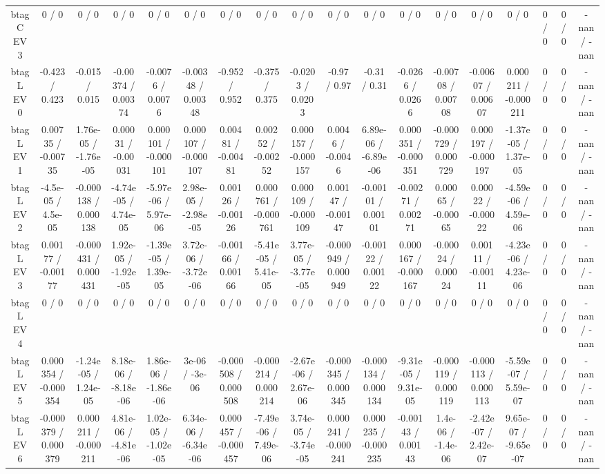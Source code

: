\documentclass[10pt]{article}
\begin{document}
\begin{table}[htbp]
\begin{center}
\begin{tabular}{|c|c|c|c|c|c|c|c|c|c|c|c|c|c|c|c|c|c|}
  btag C EV 3 & 0 / 0 & 0 / 0 & 0 / 0 & 0 / 0 & 0 / 0 & 0 / 0 & 0 / 0 & 0 / 0 & 0 / 0 & 0 / 0 & 0 / 0 & 0 / 0 & 0 / 0 & 0 / 0 & 0 / 0 & 0 / 0 & -nan / -nan \\ 
  btag L EV 0 & -0.423 / 0.423 & -0.015 / 0.015 & -0.00374 / 0.00374 & -0.0076 / 0.0076 & -0.00348 / 0.00348 & -0.952 / 0.952 & -0.375 / 0.375 & -0.0203 / 0.0203 & -0.97 / 0.97 & -0.31 / 0.31 & -0.0266 / 0.0266 & -0.00708 / 0.00708 & -0.00607 / 0.00607 & 0.000211 / -0.000211 & 0 / 0 & 0 / 0 & -nan / -nan \\ 
  btag L EV 1 & 0.00735 / -0.00735 & 1.76e-05 / -1.76e-05 & 0.00031 / -0.00031 & 0.000101 / -0.000101 & 0.000107 / -0.000107 & 0.00481 / -0.00481 & 0.00252 / -0.00252 & 0.000157 / -0.000157 & 0.0046 / -0.0046 & 6.89e-06 / -6.89e-06 & 0.000351 / -0.000351 & -0.000729 / 0.000729 & 0.000197 / -0.000197 & -1.37e-05 / 1.37e-05 & 0 / 0 & 0 / 0 & -nan / -nan \\ 
  btag L EV 2 & -4.5e-05 / 4.5e-05 & -0.000138 / 0.000138 & -4.74e-05 / 4.74e-05 & -5.97e-06 / 5.97e-06 & 2.98e-05 / -2.98e-05 & 0.00126 / -0.00126 & 0.000761 / -0.000761 & 0.000109 / -0.000109 & 0.00147 / -0.00147 & -0.00101 / 0.00101 & -0.00271 / 0.00271 & 0.00065 / -0.00065 & 0.00022 / -0.00022 & -4.59e-06 / 4.59e-06 & 0 / 0 & 0 / 0 & -nan / -nan \\ 
  btag L EV 3 & 0.00177 / -0.00177 & -0.000431 / 0.000431 & 1.92e-05 / -1.92e-05 & -1.39e-05 / 1.39e-05 & 3.72e-06 / -3.72e-06 & -0.00166 / 0.00166 & -5.41e-05 / 5.41e-05 & 3.77e-05 / -3.77e-05 & -0.000949 / 0.000949 & -0.00122 / 0.00122 & 0.000167 / -0.000167 & -0.00024 / 0.00024 & 0.00111 / -0.00111 & -4.23e-06 / 4.23e-06 & 0 / 0 & 0 / 0 & -nan / -nan \\ 
  btag L EV 4 & 0 / 0 & 0 / 0 & 0 / 0 & 0 / 0 & 0 / 0 & 0 / 0 & 0 / 0 & 0 / 0 & 0 / 0 & 0 / 0 & 0 / 0 & 0 / 0 & 0 / 0 & 0 / 0 & 0 / 0 & 0 / 0 & -nan / -nan \\ 
  btag L EV 5 & 0.000354 / -0.000354 & -1.24e-05 / 1.24e-05 & 8.18e-06 / -8.18e-06 & 1.86e-06 / -1.86e-06 & 3e-06 / -3e-06 & -0.000508 / 0.000508 & -0.000214 / 0.000214 & -2.67e-06 / 2.67e-06 & -0.000345 / 0.000345 & -0.000134 / 0.000134 & -9.31e-05 / 9.31e-05 & -0.000119 / 0.000119 & -0.000113 / 0.000113 & -5.59e-07 / 5.59e-07 & 0 / 0 & 0 / 0 & -nan / -nan \\ 
  btag L EV 6 & -0.000379 / 0.000379 & 0.000211 / -0.000211 & 4.81e-06 / -4.81e-06 & 1.02e-05 / -1.02e-05 & 6.34e-06 / -6.34e-06 & 0.000457 / -0.000457 & -7.49e-06 / 7.49e-06 & 3.74e-05 / -3.74e-05 & 0.000241 / -0.000241 & 0.000235 / -0.000235 & -0.00143 / 0.00143 & 1.4e-06 / -1.4e-06 & -2.42e-07 / 2.42e-07 & 9.65e-07 / -9.65e-07 & 0 / 0 & 0 / 0 & -nan / -nan \\ 

\end{tabular}
\end{center}
\end{table}
\end{document}
